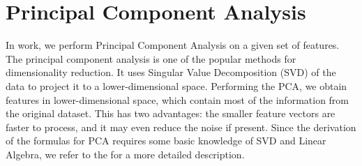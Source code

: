 \section{Principal Component Analysis}

In work, we perform Principal Component Analysis on a given set of features. The principal component analysis is one of the popular methods for dimensionality reduction. It uses Singular Value Decomposition (SVD) of the data to project it to a lower-dimensional space. Performing the PCA, we obtain features in lower-dimensional space, which contain most of the information from the original dataset. This has two advantages: the smaller feature vectors are faster to process, and it may even reduce the noise if present. Since the derivation of the formulas for PCA requires some basic knowledge of SVD and Linear Algebra, we refer to the \cite{alpaydin2020introduction} for a more detailed description.

